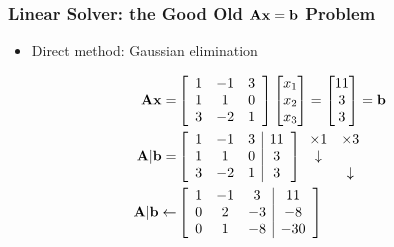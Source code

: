\documentclass[t,12pt,numbers,fleqn]{beamer}
\begin{document}



\begin{frame}
\frametitle{Linear Solver: the Good Old \(\mathbf{A}\mathbf{x} = \mathbf{b}\) Problem}

\begin{itemize}
\item Direct method: Gaussian elimination
\end{itemize}

\[
  \begin{aligned}
    \mathbf{A}\mathbf{x} = &
    \left[
    \begin{array}{ccc}
      1 & -1 & 3 \\
      1 &  1 & 0 \\
      3 & -2 & 1
    \end{array}
    \right]
    \begin{bmatrix}
      x_1 \\
      x_2 \\
      x_3
    \end{bmatrix}
    =
    \begin{bmatrix}
      11 \\
      3 \\
      3
    \end{bmatrix}
    = \mathbf{b}
    \\
    \mathbf{A}|\mathbf{b} = &
    \left[
    \begin{array}{ccc|c}
      1 & -1 & 3 & 11 \\
      1 &  1 & 0 &  3 \\
      3 & -2 & 1 &  3
    \end{array}
    \right]
    \begin{array}{cc}
      \times 1 & \times 3 \\
      \downarrow   & \\
               & \downarrow
    \end{array}
    \\
    \mathbf{A}|\mathbf{b} \leftarrow &
    \left[
    \begin{array}{ccc|c}
      1 & -1 & 3 &  11 \\
      0 &  2 & -3 &  -8 \\
      0 &  1 & -8 & -30
    \end{array}
    \right]
  \end{aligned}
\]

\end{frame}
\end{document}
